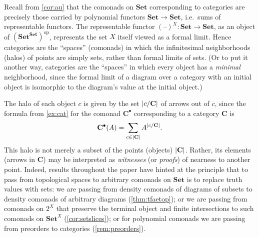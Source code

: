 \documentclass[11pt, oneside, article]{memoir}
\theoremstyle{plain}
\theoremstyle{definition}
\theoremstyle{remark}
\newenvironment{remark}
{\renewcommand\qedsymbol{$\lrcorner$}%
  \pushQED{\qed}\myremark}
{\popQED\endmyremark}
\DeclareMathOperator{\ophelper}{op}
\DeclarePairedDelimiter{\abs}{\lvert}{\rvert}
\newcommand{\dash}{{\mathord{\text{--}}}}
\newcommand{\op}{^{\ophelper}}
\newcommand{\Pow}[1]{2^{#1}}
\newcommand{\namedcat}[1]{\mathbf{#1}}
\newcommand{\cat}[1]{\mathbf{#1}}
\newcommand{\Set}{\namedcat{Set}}
\newcommand{\pts}[1]{{\abs{#1}}}
\newcommand{\obs}[1]{\pts{#1}}
\newcommand{\fun}[2]{{#2}^{#1}}
\newcommand{\End}[1]{\fun{#1}{#1}}
\newcommand{\SetSet}{\End{\Set}}
\newcommand{\xA}{A}
\newcommand{\xX}{X}
\newcommand{\bC}{\cat{C}}
\newcommand{\cbC}{\cattocmd{\bC}}
\newcommand{\cattocmd}[1]{{{#1}^\bullet}}
\begin{document}
\begin{remark}[Categories]\label{rem:categoryhalos}
  Recall from \cref{cor:au} that the comonads on $\Set$ corresponding
  to categories are precisely those carried by polynomial functors
  $\Set \to \Set$, i.e.\ sums of representable functors. The
  representable functor $(\dash)^\xX \colon \Set \to \Set$, as an
  object of $(\SetSet)\op$, represents the set $\xX$ itself viewed as
  a formal limit. Hence categories are the ``spaces'' (comonads) in
  which the infinitesimal neighborhoods (halos) of points are simply
  sets, rather than formal limits of sets. (Or to put it another way,
  categories are the ``spaces'' in which every object has a
  \emph{minimal} neighborhood, since the formal limit of a diagram
  over a category with an initial object is isomorphic to the
  diagram's value at the initial object.)

  The halo of each object $c$ is given by the set $\obs{c / \bC}$ of
  arrows out of $c$, since the formula from \cref{ex:cat} for the
  comonad $\cbC$ corresponding to a category $\bC$ is
  \[
    \cbC(\xA) = \sum_{c \in \pts{\bC}} \xA^{\obs{c / \bC}}.
  \]
  This halo is not merely a subset of the points (objects)
  $\obs{\bC}$. Rather, its elements (arrows in $\bC$) may be
  interpreted as \emph{witnesses} (or \emph{proofs}) of nearness to
  another point. Indeed, results throughout the paper have hinted at
  the principle that to pass from topological spaces to arbitrary
  comonads on $\Set$ is to replace truth values with sets: we are
  passing from density comonads of diagrams of subsets to density
  comonads of arbitrary diagrams (\cref{thm:tfaetop}); or we are
  passing from comonads on $\Pow{\xX}$ that preserve the terminal
  object and finite intersections to such comonads on $\Set^X$
  (\cref{cor:setslices}); or for polynomial comonads we are passing
  from preorders to categories (\cref{rem:preorders}).
  


\end{remark}
\end{document}
